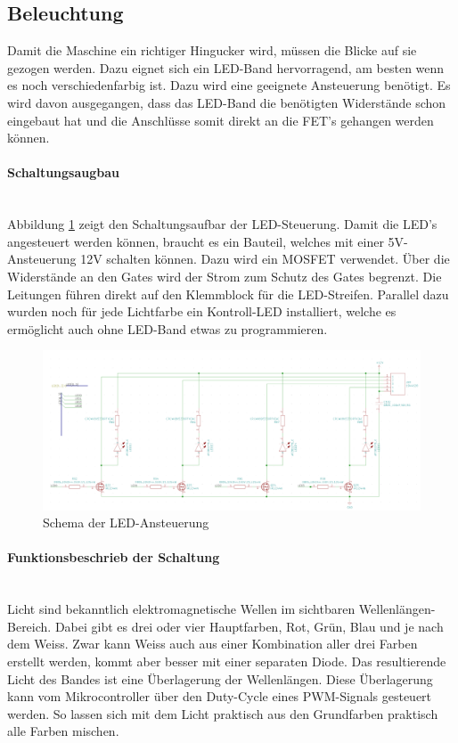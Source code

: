 \subsection{Beleuchtung}
\label{subsec:Beleuchtung}


Damit die Maschine ein richtiger Hingucker wird, müssen die Blicke auf sie gezogen werden. Dazu eignet sich ein LED-Band hervorragend, am besten wenn es noch verschiedenfarbig ist. Dazu wird eine geeignete Ansteuerung benötigt. Es wird davon ausgegangen, dass das LED-Band die benötigten Widerstände schon eingebaut hat und die Anschlüsse somit direkt an die FET's gehangen werden können.

\paragraph{Schaltungsaugbau}\mbox{}\\

Abbildung \ref{fig:Schema_LED} zeigt den Schaltungsaufbar der LED-Steuerung. Damit die LED's angesteuert werden können, braucht es ein Bauteil, welches mit einer 5V-Ansteuerung 12V schalten können. Dazu wird ein MOSFET verwendet. Über die Widerstände an den Gates wird der Strom zum Schutz des Gates begrenzt. Die Leitungen führen direkt auf den Klemmblock für die LED-Streifen. Parallel dazu wurden noch für jede Lichtfarbe ein Kontroll-LED installiert, welche es ermöglicht auch ohne LED-Band etwas zu programmieren.

\begin{figure}[!h]
\center
\includegraphics[width = \textwidth]{graphics/Schema_LED}
\caption{Schema der LED-Ansteuerung}
\label{fig:Schema_LED}
\end{figure}

\paragraph{Funktionsbeschrieb der Schaltung}\mbox{}\\

Licht sind bekanntlich elektromagnetische Wellen im sichtbaren Wellenlängen-Bereich. Dabei gibt es drei oder vier Hauptfarben, Rot, Grün, Blau und je nach dem Weiss. Zwar kann Weiss auch aus einer Kombination aller drei Farben erstellt werden, kommt aber besser mit einer separaten Diode. Das resultierende Licht des Bandes ist eine Überlagerung der Wellenlängen. Diese Überlagerung kann vom Mikrocontroller über den Duty-Cycle eines PWM-Signals gesteuert werden. So lassen sich mit dem Licht praktisch aus den Grundfarben praktisch alle Farben mischen.